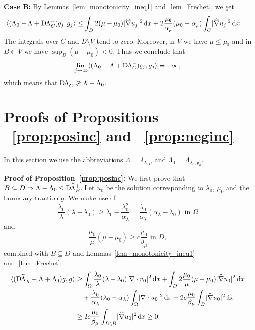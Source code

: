 \documentclass[reqno]{amsart}
\numberwithin{equation}{section}
\numberwithin{figure}{section}
\numberwithin{table}{section}
\newcommand{\abs}[1]{\lvert#1\rvert}
\newcommand{\inner}[1]{\langle#1\rangle}
\newcommand{\di}{\mathrm{d}}
\newcommand{\DLambda}{\textup{D}\mkern-1.5mu \Lambda}
\newcommand{\DhLambda}{\textup{D}\mkern-1.5mu \widehat{\Lambda}}
\theoremstyle{definition}
\theoremstyle{plain}
\theoremstyle{definition}
\theoremstyle{remark}
\numberwithin{equation}{section}
\begin{document}
\textbf{Case B:} By Lemmas~\ref{lem_monotonicity_ineq1} and~\ref{lem_Frechet}, we get
%
\begin{align*}
	\inner{(\Lambda_0 - \Lambda + \DLambda_C^-)g_j,g_j} &\leq \int_{D} 2(\mu - \mu_0)\abs{\widehat{\nabla}u_j}^2\,\di x + 2\frac{\mu_0}{\alpha_\mu}(\mu_0-\alpha_\mu)\int_C \abs{\widehat{\nabla}u_j}^2\,\di x.
\end{align*}
%
The integrals over $C$ and $D\setminus V$ tend to zero. Moreover, in $V$ we have $\mu\leq \mu_0$ and in $B\Subset V$ we have $\sup_B(\mu-\mu_0)<0$. Thus we conclude that
%
\begin{equation*}
	\lim_{j\to\infty}\inner{(\Lambda_0 - \Lambda + \DLambda_C^-)g_j,g_j} = -\infty,
\end{equation*}
%
which means that $\DLambda_C^- \not\geq \Lambda-\Lambda_0$.

\section{Proofs of Propositions ~\ref{prop:posinc} and ~\ref{prop:neginc}} \label{sec:proofneginc}

In this section  we use the  abbreviations $\Lambda = \Lambda_{\lambda,\mu}$ and $\Lambda_0 = \Lambda_{\lambda_0,\mu_0}$.

\medskip
\textbf{Proof of Proposition~\ref{prop:posinc}:}
We first prove that $B \subseteq D \Rightarrow \Lambda - \Lambda_0 \leq \DhLambda^+_B$. Let $u_0$ be the solution corresponding to $\lambda_0$, $\mu_0$ and the boundary traction $g$. We make use of 
%
\begin{equation*}
	\frac{\lambda_0}{\lambda}(\lambda - \lambda_0) \geq \lambda_0-\frac{\lambda_0^2}{\alpha_\lambda} = \frac{\lambda_0}{\alpha_\lambda}(\alpha_\lambda-\lambda_0) \text{ in } \Omega
\end{equation*} 
%
and 
%
\begin{equation*}
	\frac{\mu_0}{\mu}(\mu - \mu_0) \geq c\frac{\mu_0}{\beta_\mu} \text{ in } D,
\end{equation*}
%
combined with $B\subseteq D$ and Lemmas~\ref{lem_monotonicity_ineq1} and~\ref{lem_Frechet}: 
%
\begin{align*}
	\inner{(\DhLambda_B^+-\Lambda+\Lambda_0)g,g} &\geq \int_{\Omega} \frac{\lambda_0}{\lambda}(\lambda - \lambda_0)\abs{\nabla\cdot u_0}^2\,\di x + \int_D 2\frac{\mu_0}{\mu}(\mu - \mu_0)\abs{\widehat{\nabla}u_0}^2\,\di x \\
	&\hphantom{\geq{}} + \frac{\lambda_0}{\alpha_\lambda}(\lambda_0-\alpha_\lambda)\int_\Omega \abs{\nabla\cdot u_0}^2\,\di x - 2c\frac{\mu_0}{\beta_\mu}\int_B\abs{\widehat{\nabla}u_0}^2\,\di x \\
	&\geq 2c\frac{\mu_0}{\beta_\mu}\int_{D\setminus B} \abs{\widehat{\nabla}u_0}^2\,\di x \geq 0.
\end{align*}
\end{document}
